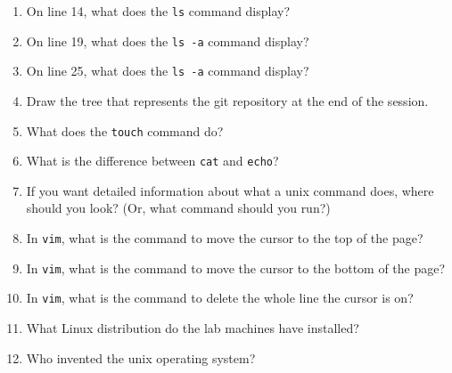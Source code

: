 \documentclass{article}
\begin{document}
\begin{enumerate}
\item On line 14, what does the \lstinline{ls} command display?
\vspace{0.5in}

\item On line 19, what does the \lstinline{ls -a} command display?
\vspace{0.5in}

\item On line 25, what does the \lstinline{ls -a} command display?
\vspace{0.5in}

\item Draw the tree that represents the git repository at the end of the session.
\vspace{0.5in}

\newpage
\item What does the \lstinline{touch} command do?
\vspace{0.5in}

\item What is the difference between \lstinline{cat} and \lstinline{echo}?
\vspace{0.5in}

\item If you want detailed information about what a unix command does, where should you look?  (Or, what command should you run?)
\vspace{0.5in}

\item In \lstinline{vim}, what is the command to move the cursor to the top of the page?
\vspace{0.5in}

\item In \lstinline{vim}, what is the command to move the cursor to the bottom of the page?
\vspace{0.5in}

\item In \lstinline{vim}, what is the command to delete the whole line the cursor is on?
\vspace{0.5in}

\item What Linux distribution do the lab machines have installed?
\vspace{0.5in}

\item Who invented the unix operating system?
\vspace{0.5in}

\end{enumerate}
\end{document}
